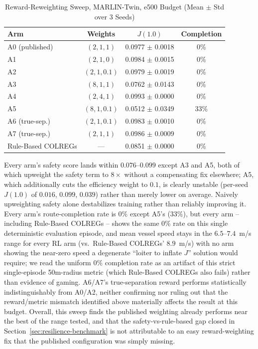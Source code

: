 \documentclass[journal,twocolumn,10pt]{IEEEtran}
\begin{document}
\begin{table}[h]
\caption{Reward-Reweighting Sweep, MARLIN-Twin, e500 Budget (Mean $\pm$ Std over 3 Seeds)}
\label{tab:reward_table}
\centering
\begin{tabular}{lccc}
\toprule
\textbf{Arm} & \textbf{Weights} & \textbf{$J(1.0)$} & \textbf{Completion} \\
\midrule
A0 (published) & $(2, 1, 1)$ & 0.0977 $\pm$ 0.0018 & 0\% \\
A1 & $(2, 1, 0)$ & 0.0984 $\pm$ 0.0015 & 0\% \\
A2 & $(2, 1, 0.1)$ & 0.0979 $\pm$ 0.0019 & 0\% \\
A3 & $(8, 1, 1)$ & 0.0762 $\pm$ 0.0143 & 0\% \\
A4 & $(2, 4, 1)$ & 0.0993 $\pm$ 0.0000 & 0\% \\
A5 & $(8, 1, 0.1)$ & 0.0512 $\pm$ 0.0349 & 33\% \\
A6 (true-sep.) & $(2, 1, 0.1)$ & 0.0983 $\pm$ 0.0010 & 0\% \\
A7 (true-sep.) & $(2, 1, 1)$ & 0.0986 $\pm$ 0.0009 & 0\% \\
\midrule
Rule-Based COLREGs & --- & 0.0851 $\pm$ 0.0000 & 0\% \\
\bottomrule
\end{tabular}
\end{table}

Every arm's safety score lands within $0.076$--$0.099$ except A3 and A5, both of which upweight the safety term to $8\times$ without a compensating fix elsewhere; A5, which additionally cuts the efficiency weight to $0.1$, is clearly unstable (per-seed $J(1.0)$ of $0.016$, $0.099$, $0.039$) rather than merely lower on average. Naively upweighting safety alone destabilizes training rather than reliably improving it. Every arm's route-completion rate is $0\%$ except A5's ($33\%$), but every arm -- including Rule-Based COLREGs -- shows the same $0\%$ rate on this single deterministic evaluation episode, and mean vessel speed stays in the $6.5$--$7.4$~m/s range for every RL arm (vs.\ Rule-Based COLREGs' $8.9$~m/s) with no arm showing the near-zero speed a degenerate ``loiter to inflate $J$'' solution would require; we read the uniform $0\%$ completion rate as an artifact of this strict single-episode 50m-radius metric (which Rule-Based COLREGs also fails) rather than evidence of gaming. A6/A7's true-separation reward performs statistically indistinguishably from A0/A2, neither confirming nor ruling out that the reward/metric mismatch identified above materially affects the result at this budget. Overall, this sweep finds the published weighting already performs near the best of the range tested, and that the safety-vs-rule-based gap closed in Section~\ref{sec:resilience-benchmark} is not attributable to an easy reward-weighting fix that the published configuration was simply missing.
\end{document}
